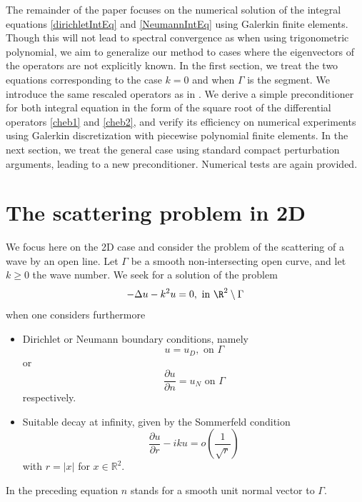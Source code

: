 \documentclass[a4paper]{article}
\begin{document}
	
	The remainder of the paper focuses on the numerical solution of the integral equations \eqref{dirichletIntEq} and \eqref{NeumannIntEq} using Galerkin finite elements. Though this will not lead to spectral convergence as when using trigonometric polynomial, we aim to generalize our method to cases where the eigenvectors of the operators are not explicitly known. In the first section, we treat the two equations corresponding to the case $k=0$ and when $\Gamma$ is the segment. We introduce the same rescaled operators as in \cite{bruno2012second}. We derive a simple preconditioner for both integral equation in the form of the square root of the differential operators \eqref{cheb1} and \eqref{cheb2}, and verify its efficiency on numerical experiments using Galerkin discretization with piecewise polynomial finite elements. In the next section, we treat the general case using standard compact perturbation arguments, leading to a new preconditioner. Numerical tests are again provided.
	
	
	\section{The scattering problem in 2D}
	We focus here on the 2D case and consider the problem of the scattering of a wave by an open line. Let $\Gamma$ be a smooth non-intersecting open curve, and let $k \geq 0$ the wave number. We seek for a solution of the problem
	\begin{equation}
	-\Delta u - k^2 u = 0,  \text{ in } \R^2 \setminus \Gamma
	\label{Helmholtz}
	\end{equation}
	when one considers furthermore
	\begin{itemize}
		\item Dirichlet or Neumann boundary conditions, namely
		\begin{equation}
		u = u_D, \text{ on } \Gamma
		\label{Dirichlet}
		\end{equation}
		or
		\begin{equation}
		\dfrac{\partial u}{\partial n} = u_N  \text{ on } \Gamma 
		\label{Neumann}
		\end{equation}
		respectively.
		\item Suitable decay at infinity, given by the Sommerfeld condition
		\begin{equation}
		\dfrac{\partial u}{\partial r} - iku = o\left(\frac{1}{\sqrt{r}}\right)
		\label{Sommerfeld}
		\end{equation}
		with $r=|x|$ for $x\in \mathbb{R}^2$.
	\end{itemize}
	In the preceding equation $n$ stands for a smooth unit normal vector to $\Gamma$.
	
\end{document}
